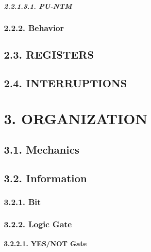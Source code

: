 \documentclass[
]{article}
\begin{document}
\hypertarget{pu-ntm-2}{%
\subparagraph{2.2.1.3.1. PU-NTM}\label{pu-ntm-2}}

\hypertarget{behavior}{%
\subsubsection{2.2.2. Behavior}\label{behavior}}

\hypertarget{registers}{%
\subsection{2.3. REGISTERS}\label{registers}}

\hypertarget{interruptions}{%
\subsection{2.4. INTERRUPTIONS}\label{interruptions}}

\hypertarget{organization}{%
\section{3. ORGANIZATION}\label{organization}}

\hypertarget{mechanics}{%
\subsection{3.1. Mechanics}\label{mechanics}}

\hypertarget{information}{%
\subsection{3.2. Information}\label{information}}

\hypertarget{bit}{%
\subsubsection{3.2.1. Bit}\label{bit}}

\hypertarget{logic-gate}{%
\subsubsection{3.2.2. Logic Gate}\label{logic-gate}}

\hypertarget{yesnot-gate}{%
\paragraph{3.2.2.1. YES/NOT Gate}\label{yesnot-gate}}
\end{document}
